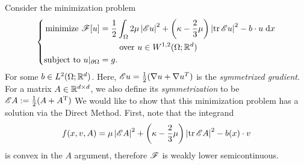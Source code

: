 \begin{example}
    Consider the minimization problem 
    \begin{equation} \label{eq:linearizedElasticityMinimizationProblem}
        \left\{
        \begin{aligned}
            \text{minimize } \mathscr{F}[u] &= \frac{1}{2}\int_\Omega 2\mu\left\lvert {\mathscr{E}u} \right\rvert^2 + \left( {\kappa - \frac{2}{3}\mu} \right)\left\lvert {\operatorname{tr}{\mathscr{E}u}} \right\rvert^2 - b \cdot u \; \mathrm{d} x \\
                                      &\hspace{20pt} \text{ over } u \in W^{1,2}(\Omega;\mathbb{R}^d) \\
            \text{subject to } u\vert_{\partial\Omega} &= g.
        \end{aligned}
        \right.
    \end{equation}
    For some $b \in L^2(\Omega;\mathbb{R}^d)$. Here, $\mathscr{E} u = \frac{1}{2}(\nabla u + \nabla u^T)$ is the \textit{symmetrized gradient}. For a matrix $A \in \mathbb{R}^{d \times d}$, we also define its \textit{symmetrization} to be $\mathscr{E} A := \frac{1}{2}(A + A^{\rm T})$ We would like to show that this minimization problem has a solution via the Direct Method. First, note that the integrand 
    \begin{equation}
        f(x,v,A) = \mu \left\lvert {\mathscr{E}A} \right\rvert^2 + \left( { \kappa - \frac{2}{3} \mu } \right)\left\lvert {\operatorname{tr}{\mathscr{E}A}} \right\rvert^2 - b(x) \cdot v
    \end{equation}
    is convex in the $A$ argument, therefore $\mathscr{F}$ is weakly lower semicontinuous.


\end{example}

